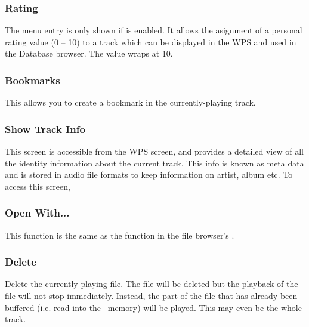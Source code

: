 \subsubsection{Rating}
The menu entry is only shown if  is
enabled. It allows the asignment of a personal rating value (0 -- 10)
to a track which can be displayed in the WPS and used in the Database
browser. The value wraps at 10.

\subsubsection{Bookmarks}
This allows you to create a bookmark in the currently-playing track.

\subsubsection{\label{ref:trackinfoviewer}Show Track Info}
This screen is accessible from the WPS screen, and provides a detailed view of
all the identity information about the current track. This info is known as
meta data and is stored in audio file formats to keep information on artist,
album etc. To access this screen, %
%
%
%

\subsubsection{Open With...}
This  function is the same as the  
function in the file browser's \setting{Context Menu}.

\subsubsection{Delete}
Delete the currently playing file. The file will be deleted but the playback
of the file will not stop immediately. Instead, the part of the file that
has already been buffered (i.e. read into the \daps\ memory) will be played.
This may even be the whole track.

